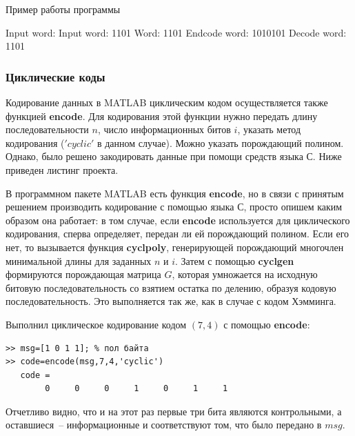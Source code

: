 \documentclass[12pt,a4paper]{article}
\begin{document}
Пример работы программы

Input word: Input word: 1101
Word: 1101
Endcode word: 1010101
Decode word: 1101

  
\subsubsection{Циклические коды}
  
  Кодирование данных в MATLAB циклическим кодом осуществляется также функцией \textbf{encode}. Для кодирования этой функции нужно передать длину последовательности $n$, число информационных битов $i$, указать метод кодирования ($'cyclic'$ в данном случае). Можно указать порождающий полином.
Однако, было решено закодировать данные при помощи средств языка С. Ниже приведен листинг проекта.
  
  В программном пакете MATLAB есть функция \textbf{encode}, но в связи с принятым решением производить кодирование с помощью языка С, просто опишем каким образом она работает: в том случае, если \textbf{encode} используется для циклического кодирования, сперва определяет, передан ли ей порождающий полином. Если его нет, то вызывается функция \textbf{cyclpoly}, генерирующей порождающий многочлен минимальной длины для заданных $n$ и $i$. Затем с помощью \textbf{cyclgen} формируются порождающая матрица $G$, которая умножается на исходную битовую последовательность со взятием остатка по делению, образуя кодовую последовательность. Это выполняется так же, как в случае с кодом Хэмминга.
  
  Выполнил циклическое кодирование кодом $(7,4)$ с помощью \textbf{encode}:
  \begin{lstlisting}
>> msg=[1 0 1 1]; % пол байта
>> code=encode(msg,7,4,'cyclic')
   code =
        0     0     0     1     0     1     1
  \end{lstlisting}
  Отчетливо видно, что и на этот раз первые три бита являются контрольными, а оставшиеся~-- информационные и соответствуют том, что было передано в $msg$.
\end{document}
